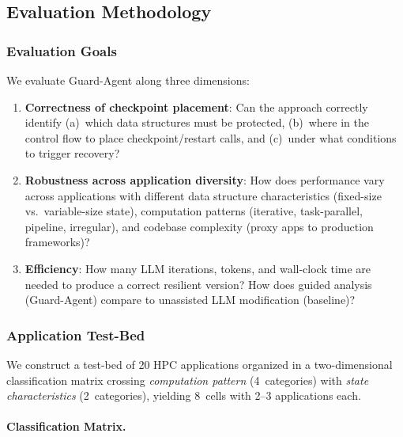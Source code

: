 \subsection{Evaluation Methodology}
\label{sec:evaluation}

\subsubsection{Evaluation Goals}
\label{sec:eval-goals}

We evaluate Guard-Agent along three dimensions:

\begin{enumerate}
    \item \textbf{Correctness of checkpoint placement}: Can the approach correctly identify (a)~which data structures must be protected, (b)~where in the control flow to place checkpoint/restart calls, and (c)~under what conditions to trigger recovery?

    \item \textbf{Robustness across application diversity}: How does performance vary across applications with different data structure characteristics (fixed-size vs.\ variable-size state), computation patterns (iterative, task-parallel, pipeline, irregular), and codebase complexity (proxy apps to production frameworks)?

    \item \textbf{Efficiency}: How many LLM iterations, tokens, and wall-clock time are needed to produce a correct resilient version? How does guided analysis (Guard-Agent) compare to unassisted LLM modification (baseline)?
\end{enumerate}

\subsubsection{Application Test-Bed}
\label{sec:testbed}

We construct a test-bed of 20 HPC applications organized in a two-dimensional classification matrix crossing \emph{computation pattern} (4~categories) with \emph{state characteristics} (2~categories), yielding 8~cells with 2--3 applications each.

\paragraph{Classification Matrix.}

